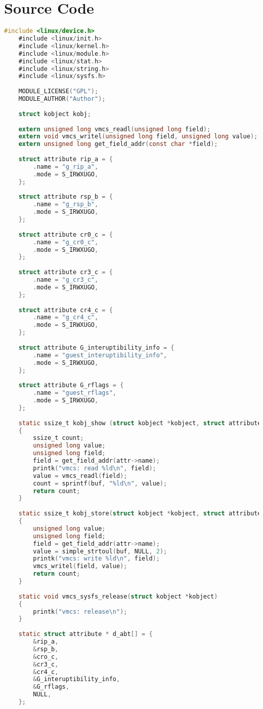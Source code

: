 \documentclass[10pt,draftclsnofoot,peerreview ,letterpaper,onecolumn,]{IEEEtran}
\begin{document}
	\section{Source Code}
	\begin{lstlisting}[language=C]
	#include <linux/device.h>
	#include <linux/init.h>
	#include <linux/kernel.h>
	#include <linux/module.h>
	#include <linux/stat.h>
	#include <linux/string.h>
	#include <linux/sysfs.h>
	
	MODULE_LICENSE("GPL");
	MODULE_AUTHOR("Author");
	
	struct kobject kobj;
	
	extern unsigned long vmcs_readl(unsigned long field);
	extern void vmcs_writel(unsigned long field, unsigned long value);
	extern unsigned long get_field_addr(const char *field);
	
	struct attribute rip_a = {
		.name = "g_rip_a",
		.mode = S_IRWXUGO,
	};
	
	struct attribute rsp_b = {
		.name = "g_rsp_b",
		.mode = S_IRWXUGO,
	};
	
	struct attribute cr0_c = {
		.name = "g_cr0_c",
		.mode = S_IRWXUGO,
	};
	
	struct attribute cr3_c = {
		.name = "g_cr3_c",
		.mode = S_IRWXUGO,
	};
	
	struct attribute cr4_c = {
		.name = "g_cr4_c",
		.mode = S_IRWXUGO,
	};
	
	struct attribute G_interuptibility_info = {
		.name = "guest_interuptibility_info",
		.mode = S_IRWXUGO,
	};
	
	struct attribute G_rflags = {
		.name = "guest_rflags",
		.mode = S_IRWXUGO,
	};
	
	static ssize_t kobj_show (struct kobject *kobject, struct attribute *attr, char *buf) 
	{
		ssize_t count;
		unsigned long value;
		unsigned long field;
		field = get_field_addr(attr->name);
		printk("vmcs: read %ld\n", field);
		value = vmcs_readl(field);
		count = sprintf(buf, "%ld\n", value);
		return count;
	}
	
	static ssize_t kobj_store(struct kobject *kobject, struct attribute *attr, const char *buf, size_t count) 
	{
		unsigned long value;
		unsigned long field;
		field = get_field_addr(attr->name);
		value = simple_strtoul(buf, NULL, 2);
		printk("vmcs: write %ld\n", field);
		vmcs_writel(field, value);
		return count;
	}
	
	static void vmcs_sysfs_release(struct kobject *kobject)
	{
		printk("vmcs: release\n");
	}
	
	static struct attribute * d_abt[] = {
		&rip_a,
		&rsp_b,
		&cro_c,
		&cr3_c,
		&cr4_c,
		&G_interuptibility_info,
		&G_rflags,
		NULL,
	};
	

\end{lstlisting}
\end{document}
